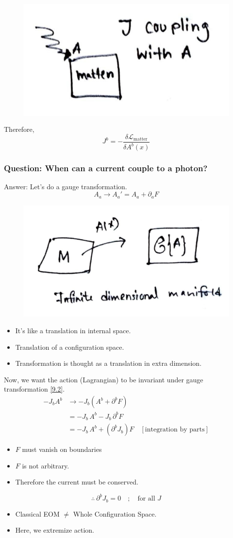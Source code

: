 \documentclass[14pt]{article} %
\begin{document}
\begin{figure}[H]
    \centering
    \includegraphics[width=0.3\linewidth]{figures/C09_1.jpeg}
    \caption*{}
\end{figure}
\vspace{-1.5cm}
Therefore,
\[
J^b = -\frac{\delta \mathcal{L}_{\text{matter}}}{\delta A^b(x)}
\]
\subsubsection*{Question: When can a current couple to a photon?}
Answer: Let's do a gauge transformation.
\[
A_a \rightarrow A_a' = A_a + \partial_a F \tag{9.2} \label{9.2}
\]
\begin{figure}[H]
    \centering
    \includegraphics[width=0.4\linewidth]{figures/C09_2.jpeg}
    \caption*{}
\end{figure}
\vspace{-1cm}
\begin{tcolorbox}[title=Notes]
\begin{itemize}
    \item It's like a translation in internal space.
    \item Translation of a configuration space.
    \item Transformation is thought as a translation in extra dimension.
\end{itemize}
\end{tcolorbox}
Now, we want the action (Lagrangian) to be invariant under gauge transformation \eqref{9.2}.
\begin{align*}
-J_b A^b &\to -J_b (A^b + \partial^b F) \\
&= -J_b \, A^b - J_b \,\partial^b F \\
&= -J_b \, A^b +(\partial^b J_b) F \quad [ \text{integration by parts} ]
\end{align*}
\begin{itemize}
    \item $F$ must vanish on boundaries
    \item $F$ is not arbitrary.
    \item Therefore the current must be conserved.
\end{itemize}
\[
\therefore ~\partial^b J_b = 0 \quad; \quad \text{for all } J
\]
\begin{itemize}
    \item Classical EOM $\neq$ Whole Configuration Space.
    \item Here, we extremize action.
\end{itemize}
\end{document}
